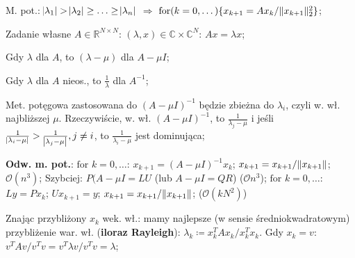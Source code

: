 
\entry
M. pot.:
$\abs{\lambda_1}>\abs{\lambda_2}\geq\ldots\geq\abs{\lambda_n}$
$\Rightarrow$
$\mathrm{for}(k=0,\dots)\{x_{k+1}=Ax_k / \|x_{k+1}\|^2_2\}$;

\entry
Zadanie własne $A \in \mathbb{R}^{N \times N}$:
$(\lambda,x) \in \mathbb{C} \times \mathbb{C}^N$:
$Ax = \lambda x$;

\entry
Gdy $\lambda$ dla $A$, to $(\lambda - \mu)$ dla $A-\mu I$;

\entry
Gdy $\lambda$ dla $A$ nieos., to $\frac{1}{\lambda}$ dla $A^{-1}$;

\entry
Met. potęgowa zastosowana do
$(A-\mu I)^{-1}$
będzie zbieżna do
$\lambda_i$,
czyli w. wł. najbliższej $\mu$.
Rzeczywiście, w. wł.
$(A-\mu I)^{-1}$,
to
$\frac{1}{\lambda_j-\mu}$
i jeśli
$\frac{1}{\abs{\lambda_i-\mu}} > \frac{1}{\abs{\lambda_j-\mu}}, j\neq i$,
to
$\frac{1}{\lambda_i-\mu}$
jest dominująca;


\entry
\textbf{Odw. m. pot.}:
$\text{for } k=0,\ldots$:
$x_{k+1} = (A-\mu I)^{-1}x_k$;
$x_{k+1} = x_{k+1} / \|x_{k+1}\|$;
$\mathcal{O}(n^3)$;
\entry
Szybciej:
$P(A- \mu I = LU$ (lub $A-\mu I = QR$) ($\mathcal{O}{n^3}$);
$\text{for } k=0,\ldots$:
$Ly=Px_k$;
$Ux_{k+1} = y$;
$x_{k+1} = x_{k+1} / \|x_{k+1}\|$;
($\mathcal{O}(kN^2)$)

\entry
Znając przybliżony $x_k$ wek. wł.: mamy najlepsze (w sensie
średniokwadratowym) przybliżenie war. wł. (\textbf{iloraz Rayleigh}):
$\lambda_k \coloneqq x_k^T A x_k / x_k^T x_k$.
Gdy $x_k = v$:
$v^T A v / v^T v = v^T \lambda v / v^T v = \lambda$;






